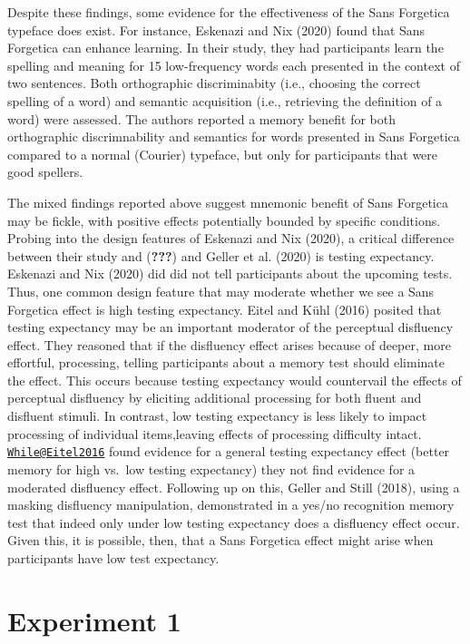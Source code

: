 \documentclass[
  english,
  jou]{apa6}
\begin{document}
Despite these findings, some evidence for the effectiveness of the Sans Forgetica typeface does exist. For instance, Eskenazi and Nix (2020) found that Sans Forgetica can enhance learning. In their study, they had participants learn the spelling and meaning for 15 low-frequency words each presented in the context of two sentences. Both orthographic discriminabity (i.e., choosing the correct spelling of a word) and semantic acquisition (i.e., retrieving the definition of a word) were assessed. The authors reported a memory benefit for both orthographic discrimnability and semantics for words presented in Sans Forgetica compared to a normal (Courier) typeface, but only for participants that were good spellers.

The mixed findings reported above suggest mnemonic benefit of Sans Forgetica may be fickle, with positive effects potentially bounded by specific conditions. Probing into the design features of Eskenazi and Nix (2020), a critical difference between their study and ({\textbf{???}}) and Geller et al. (2020) is testing expectancy. Eskenazi and Nix (2020) did did not tell participants about the upcoming tests. Thus, one common design feature that may moderate whether we see a Sans Forgetica effect is high testing expectancy. Eitel and Kühl (2016) posited that testing expectancy may be an important moderator of the perceptual disfluency effect. They reasoned that if the disfluency effect arises because of deeper, more effortful, processing, telling participants about a memory test should eliminate the effect. This occurs because testing expectancy would countervail the effects of perceptual disfluency by eliciting additional processing for both fluent and disfluent stimuli. In contrast, low testing expectancy is less likely to impact processing of individual items,leaving effects of processing difficulty intact. \href{mailto:While@Eitel2016}{\nolinkurl{While@Eitel2016}} found evidence for a general testing expectancy effect (better memory for high vs.~low testing expectancy) they not find evidence for a moderated disfluency effect. Following up on this, Geller and Still (2018), using a masking disfluency manipulation, demonstrated in a yes/no recognition memory test that indeed only under low testing expectancy does a disfluency effect occur. Given this, it is possible, then, that a Sans Forgetica effect might arise when participants have low test expectancy.

\hypertarget{experiment-1}{%
\section{Experiment 1}\label{experiment-1}}
\end{document}
